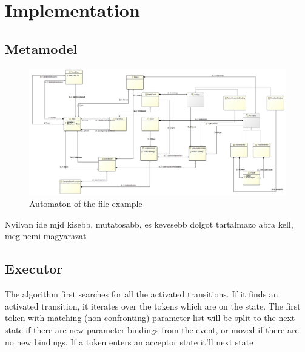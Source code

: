 	\section{Implementation}
		\subsection{Metamodel}
		
			\begin{figure}[h]
			\centering
			\includegraphics[width=0.9\linewidth]{include/figures/chapter_5/model}
			\caption{Automaton of the file example}
			\label{fig:cep:model}
			\end{figure}
		Nyilvan ide mjd kisebb, mutatosabb, es kevesebb dolgot tartalmazo abra kell, meg nemi magyarazat
		\subsection{Executor}
			The algorithm first searches for all the activated transitions.
			If it finds an activated transition, it iterates over the tokens which are on the state. The first token with matching (non-confronting)
			parameter list will be split to the next state if there are new parameter bindings from the event, or moved if there are no new bindings.
			If a token enters an acceptor state it'll 
			next state 
